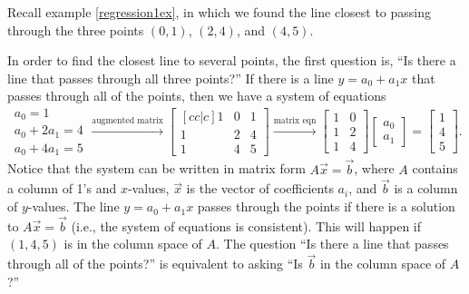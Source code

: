 \begin{example}
Recall example \ref{regression1ex}, in which we found the line closest
to passing through the three points $(0,1)$, $(2,4)$, and $(4,5)$.  

In order to find the closest line to several points, the first question is, ``Is there a line that passes through all three points?''  If there is a line $y=a_0+a_1x$ that passes through all of the points, then we have a system of equations
\begin{equation*}
\begin{matrix}a_0=1\\a_0+2a_1=4\\a_0+4a_1=5\end{matrix}
\xrightarrow{\text{augmented matrix}}
\begin{bmatrix}[cc|c]1&0&1\\1&2&4\\1&4&5\end{bmatrix}
\xrightarrow{\text{matrix eqn}}
\begin{bmatrix}1&0\\1&2\\1&4\end{bmatrix}
\begin{bmatrix}a_0\\a_1\end{bmatrix}
=\begin{bmatrix}1\\4\\5\end{bmatrix}.
\end{equation*}
Notice that the system can be written in matrix form $A\vec x = \vec b$, where $A$ contains a column of 1's and $x$-values, $\vec x$ is the vector of coefficients $a_i$, and $\vec b$ is a column of $y$-values.  
%
The line $y=a_0+a_1x$ passes through the points if there is a solution to $A\vec x=\vec b$ (i.e., the system of equations is consistent).  This will happen if $(1,4,5)$ is in the column space of $A$.  The question ``Is there a line that passes through all of the points?'' is equivalent to asking ``Is $\vec b$ in the column space of $A$?''


\end{example}
